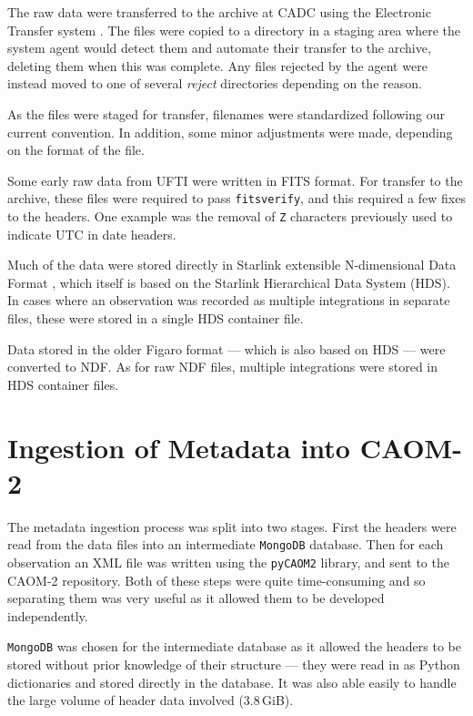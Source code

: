 \documentclass[11pt,twoside]{article}
\begin{document}
The raw data were transferred to the archive at CADC
using the
Electronic Transfer system \citep{2005ASPC..347..647M}.
The files were copied to a directory in a
staging area where the system agent would
detect them and automate their transfer to the
archive, deleting them when this was complete.
Any files rejected by the agent were instead moved
to one of several \textit{reject} directories depending
on the reason.

As the files were staged for transfer,
filenames were standardized following our current convention.
In addition,
some minor adjustments were made,
depending on the format of the file.


Some early raw data from UFTI were written in FITS format.
For transfer to the archive, these files were
required to pass
\texttt{fitsverify},
and this required a few fixes to the headers.
One example was the removal of \texttt{Z} characters
previously used to indicate UTC in date headers.


Much of the data were stored directly in
Starlink extensible N-dimensional Data Format
\citep[see for example,][]{P91_adassxxiii},
which itself is based on the
Starlink Hierarchical Data System (HDS).
In cases where an observation was recorded as
multiple integrations in separate files,
these were stored in a single HDS container file.


Data stored in the older Figaro format \citep{1993ASPC...52..219S}
--- which is also based on HDS ---
were converted to NDF.
As for raw NDF files, multiple integrations
were stored in HDS container files.

\section{Ingestion of Metadata into CAOM-2}

The metadata ingestion process was split into two stages.
First the headers were
read from the data files into an intermediate
\texttt{MongoDB} database.
Then for each observation an XML file was written
using the \texttt{pyCAOM2} library,
and sent to the CAOM-2 repository.
Both of these steps were quite time-consuming
and so separating them was very useful
as it allowed them to be developed
independently.

\texttt{MongoDB} was chosen for the intermediate database
as it allowed the
headers to be stored without prior knowledge of their structure
--- they were read in as Python dictionaries and
stored directly in the database.
It was also able easily to handle the large
volume of header data involved (3.8\,GiB).
\end{document}
